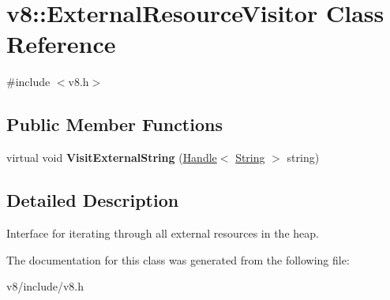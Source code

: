 \hypertarget{classv8_1_1ExternalResourceVisitor}{\section{v8\-:\-:External\-Resource\-Visitor Class Reference}
\label{classv8_1_1ExternalResourceVisitor}
}


{\ttfamily \#include $<$v8.\-h$>$}

\subsection*{Public Member Functions}
\begin{DoxyCompactItemize}
\item 
\hypertarget{classv8_1_1ExternalResourceVisitor_ab00ff4cd0d0167894faa8331b68a58c6}{virtual void {\bfseries Visit\-External\-String} (\hyperlink{classv8_1_1Handle}{Handle}$<$ \hyperlink{classv8_1_1String}{String} $>$ string)}\label{classv8_1_1ExternalResourceVisitor_ab00ff4cd0d0167894faa8331b68a58c6}

\end{DoxyCompactItemize}


\subsection{Detailed Description}
Interface for iterating through all external resources in the heap. 

The documentation for this class was generated from the following file\-:\begin{DoxyCompactItemize}
\item 
v8/include/v8.\-h\end{DoxyCompactItemize}
